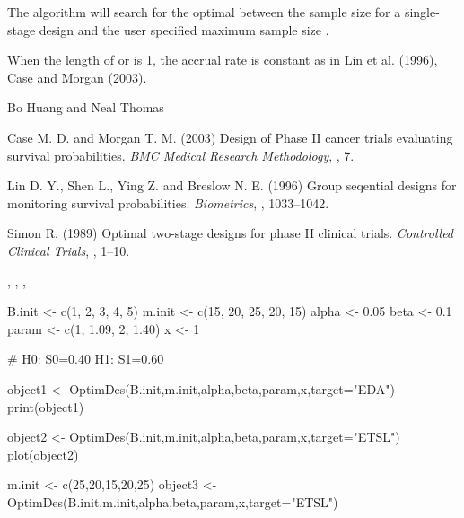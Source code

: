 \begin{Note}\relax
The algorithm will search for the optimal  between the 
sample size for a single-stage design and the
user specified maximum sample size .

When the length of  or  is 1, the accrual
rate is constant as  in Lin et al. (1996), Case and Morgan
(2003).
\end{Note}
\begin{Author}\relax
Bo Huang  and Neal Thomas
\end{Author}
\begin{References}\relax
Case M. D. and Morgan T. M. (2003) Design of Phase II cancer trials
evaluating survival probabilities. \emph{BMC Medical Research
Methodology}, , 7.

Lin D. Y., Shen L., Ying Z. and Breslow N. E. (1996) Group seqential
designs for monitoring survival probabilities. \emph{Biometrics},
, 1033--1042.

Simon R. (1989) Optimal two-stage designs for phase II clinical
trials. \emph{Controlled Clinical Trials}, , 1--10.
\end{References}
\begin{SeeAlso}\relax
{}, ,
, 
\end{SeeAlso}
\begin{Examples}
\begin{ExampleCode}
B.init <- c(1, 2, 3, 4, 5)
m.init <- c(15, 20, 25, 20, 15)
alpha <- 0.05
beta <- 0.1
param <- c(1, 1.09, 2, 1.40)
x <- 1

# H0: S0=0.40 H1: S1=0.60

object1 <- OptimDes(B.init,m.init,alpha,beta,param,x,target="EDA")
print(object1)

object2 <- OptimDes(B.init,m.init,alpha,beta,param,x,target="ETSL")
plot(object2)

m.init <- c(25,20,15,20,25)
object3 <- OptimDes(B.init,m.init,alpha,beta,param,x,target="ETSL")

\end{ExampleCode}
\end{Examples}

